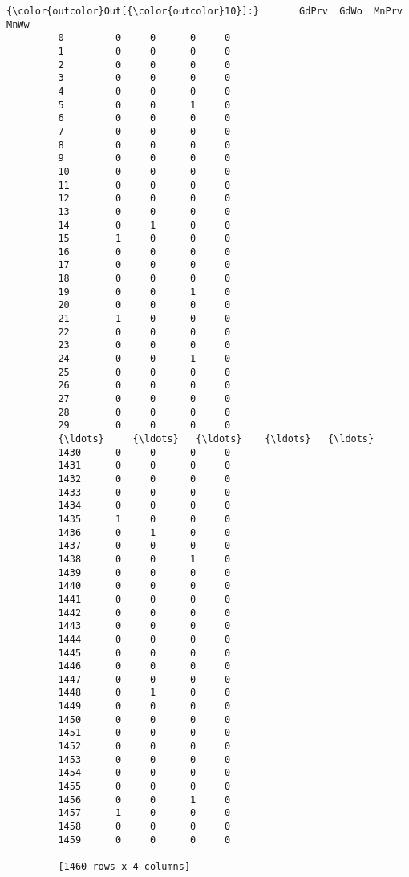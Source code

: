 \documentclass[11pt]{article}
\begin{document}
\begin{Verbatim}[commandchars=\\\{\}]
{\color{outcolor}Out[{\color{outcolor}10}]:}       GdPrv  GdWo  MnPrv  MnWw
         0         0     0      0     0
         1         0     0      0     0
         2         0     0      0     0
         3         0     0      0     0
         4         0     0      0     0
         5         0     0      1     0
         6         0     0      0     0
         7         0     0      0     0
         8         0     0      0     0
         9         0     0      0     0
         10        0     0      0     0
         11        0     0      0     0
         12        0     0      0     0
         13        0     0      0     0
         14        0     1      0     0
         15        1     0      0     0
         16        0     0      0     0
         17        0     0      0     0
         18        0     0      0     0
         19        0     0      1     0
         20        0     0      0     0
         21        1     0      0     0
         22        0     0      0     0
         23        0     0      0     0
         24        0     0      1     0
         25        0     0      0     0
         26        0     0      0     0
         27        0     0      0     0
         28        0     0      0     0
         29        0     0      0     0
         {\ldots}     {\ldots}   {\ldots}    {\ldots}   {\ldots}
         1430      0     0      0     0
         1431      0     0      0     0
         1432      0     0      0     0
         1433      0     0      0     0
         1434      0     0      0     0
         1435      1     0      0     0
         1436      0     1      0     0
         1437      0     0      0     0
         1438      0     0      1     0
         1439      0     0      0     0
         1440      0     0      0     0
         1441      0     0      0     0
         1442      0     0      0     0
         1443      0     0      0     0
         1444      0     0      0     0
         1445      0     0      0     0
         1446      0     0      0     0
         1447      0     0      0     0
         1448      0     1      0     0
         1449      0     0      0     0
         1450      0     0      0     0
         1451      0     0      0     0
         1452      0     0      0     0
         1453      0     0      0     0
         1454      0     0      0     0
         1455      0     0      0     0
         1456      0     0      1     0
         1457      1     0      0     0
         1458      0     0      0     0
         1459      0     0      0     0
         
         [1460 rows x 4 columns]
\end{Verbatim}
            
\end{document}
